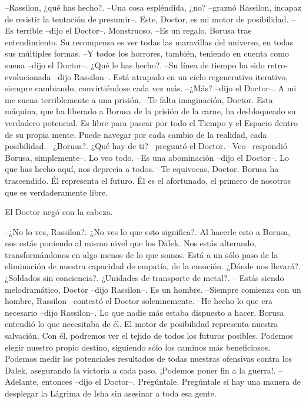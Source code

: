 --Rassilon, ¿qué has hecho?. 
--Una cosa espléndida, ¿no? --graznó Rassilon, incapaz de resistir la tentación de presumir--. Este, Doctor, es mi motor de posibilidad. 
--Es terrible --dijo el Doctor--. Monstruoso.  
--Es un regalo. Borusa trae entendimiento. Su recompensa es ver todas las maravillas del universo, en todas sus múltiples formas.  
--Y todos los horrores, también, teniendo en cuenta como suena --dijo el Doctor--. ¿Qué le has hecho?.
--Su línea de tiempo ha sido retro-evolucionada --dijo Rassilon--. Está atrapado en un ciclo regenerativo iterativo, siempre cambiando, convirtiéndose cada vez más. 
--¿Más? --dijo el Doctor--. A mi me suena terriblemente a una prisión.  
--Te falta imaginación, Doctor. Esta máquina, que ha liberado a Borusa de la prisión de la carne, ha desbloqueado su verdadero potencial. Es libre para pasear por todo el Tiempo y el Espacio dentro de su propia mente. Puede navegar por cada cambio de la realidad, cada posibilidad.  
--¿Borusa?. ¿Qué hay de ti? --preguntó el Doctor. 
--Veo --respondió Borusa, simplemente--. Lo veo todo.  
--Es una abominación --dijo el Doctor--. Lo que has hecho aquí, nos deprecia a todos.  
--Te equivocas, Doctor. Borusa ha trascendido. Él representa el futuro. Él es el afortunado, el primero de nosotros que es verdaderamente libre. 

El Doctor negó con la cabeza. 

--¿No lo ves, Rassilon?. ¿No ves lo que esto significa?. Al hacerle esto a Borusa, nos estás poniendo al mismo nivel que los Dalek. Nos estás alterando, transformándonos en algo menos de lo que somos. Está a un sólo paso de la eliminación de nuestra capacidad de empatía, de la emoción. ¿Dónde nos llevará?. ¿Soldados sin conciencia?. ¿Unidades de transporte de metal?.
 -- Estás siendo melodramático, Doctor --dijo Rassilon--. Es un hombre. 
--Siempre comienza con un hombre, Rassilon --contestó el Doctor solemnemente. 
--He hecho lo que era necesario --dijo Rassilon--. Lo que nadie más estaba dispuesto a hacer. Borusa entendió lo que necesitaba de él. El motor de posibilidad representa nuestra salvación. Con él, podremos ver el tejido de todos los futuros posibles. Podemos elegir nuestro propio destino, siguiendo sólo los caminos más beneficiosos. Podemos medir los potenciales resultados de todas nuestras ofensivas contra los Dalek, asegurando la victoria a cada paso. ¡Podemos poner fin a la guerra!. 
--Adelante, entonces --dijo el Doctor--. Pregúntale. Pregúntale si hay una manera de desplegar la Lágrima de Isha sin asesinar a toda esa gente.
 
